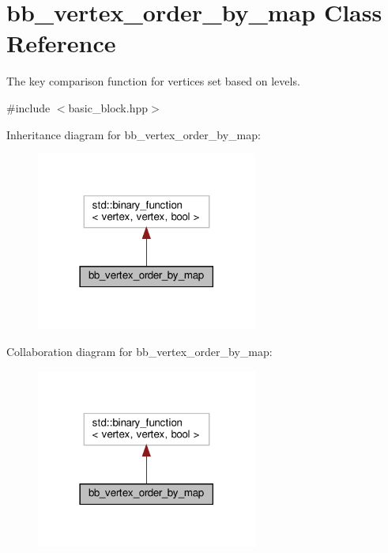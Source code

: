 \hypertarget{classbb__vertex__order__by__map}{}\section{bb\+\_\+vertex\+\_\+order\+\_\+by\+\_\+map Class Reference}
\label{classbb__vertex__order__by__map}


The key comparison function for vertices set based on levels.  




{\ttfamily \#include $<$basic\+\_\+block.\+hpp$>$}



Inheritance diagram for bb\+\_\+vertex\+\_\+order\+\_\+by\+\_\+map\+:
\nopagebreak
\begin{figure}[H]
\begin{center}
\leavevmode
\includegraphics[width=206pt]{db/dc2/classbb__vertex__order__by__map__inherit__graph}
\end{center}
\end{figure}


Collaboration diagram for bb\+\_\+vertex\+\_\+order\+\_\+by\+\_\+map\+:
\nopagebreak
\begin{figure}[H]
\begin{center}
\leavevmode
\includegraphics[width=206pt]{db/d3a/classbb__vertex__order__by__map__coll__graph}
\end{center}
\end{figure}
